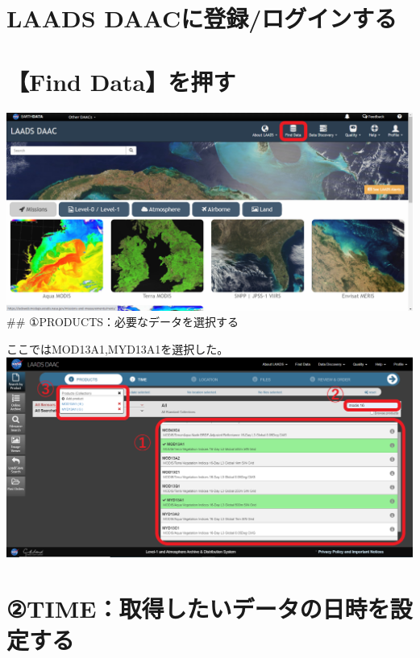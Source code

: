 \documentclass[
]{book}
\begin{document}
\hypertarget{laads-daacux306bux767bux9332ux30edux30b0ux30a4ux30f3ux3059ux308b}{%
\section{LAADS DAACに登録/ログインする}\label{laads-daacux306bux767bux9332ux30edux30b0ux30a4ux30f3ux3059ux308b}}

\hypertarget{find-dataux3092ux62bcux3059}{%
\section{【Find Data】を押す}\label{find-dataux3092ux62bcux3059}}

\includegraphics{images/LD-1.png}
\#\# ①PRODUCTS：必要なデータを選択する

ここではMOD13A1,MYD13A1を選択した。
\includegraphics{images/LD-2.png}

\hypertarget{timeux53d6ux5f97ux3057ux305fux3044ux30c7ux30fcux30bfux306eux65e5ux6642ux3092ux8a2dux5b9aux3059ux308b}{%
\section{②TIME：取得したいデータの日時を設定する}\label{timeux53d6ux5f97ux3057ux305fux3044ux30c7ux30fcux30bfux306eux65e5ux6642ux3092ux8a2dux5b9aux3059ux308b}}
\end{document}
